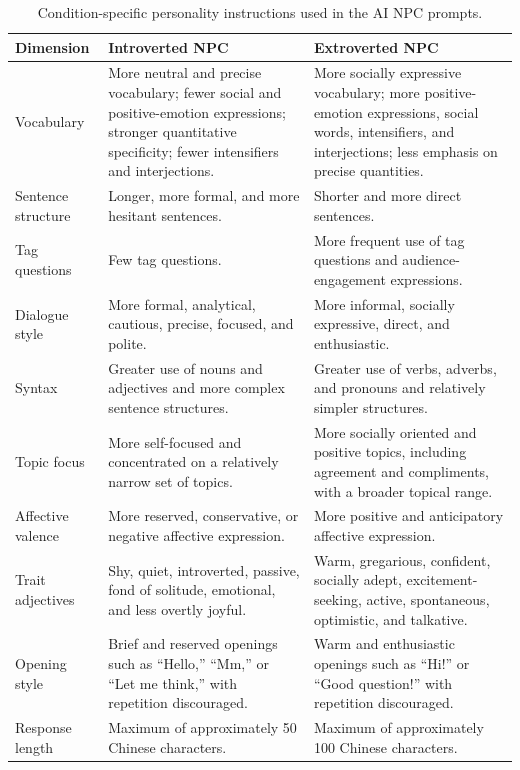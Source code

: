 \documentclass[a4paper,fleqn]{cas-sc}
\begin{document}
\begin{table}[t]
\centering
\footnotesize
\caption{Condition-specific personality instructions used in the AI NPC prompts.}
\label{tab:app-personality}
\begin{tabular}{p{}p{}p{}}
\toprule
\textbf{Dimension} &
\textbf{Introverted NPC} &
\textbf{Extroverted NPC} \\
\midrule

Vocabulary &
More neutral and precise vocabulary; fewer social and positive-emotion expressions; stronger quantitative specificity; fewer intensifiers and interjections. &
More socially expressive vocabulary; more positive-emotion expressions, social words, intensifiers, and interjections; less emphasis on precise quantities. \\

Sentence structure &
Longer, more formal, and more hesitant sentences. &
Shorter and more direct sentences. \\

Tag questions &
Few tag questions. &
More frequent use of tag questions and audience-engagement expressions. \\

Dialogue style &
More formal, analytical, cautious, precise, focused, and polite. &
More informal, socially expressive, direct, and enthusiastic. \\

Syntax &
Greater use of nouns and adjectives and more complex sentence structures. &
Greater use of verbs, adverbs, and pronouns and relatively simpler structures. \\

Topic focus &
More self-focused and concentrated on a relatively narrow set of topics. &
More socially oriented and positive topics, including agreement and compliments, with a broader topical range. \\

Affective valence &
More reserved, conservative, or negative affective expression. &
More positive and anticipatory affective expression. \\

Trait adjectives &
Shy, quiet, introverted, passive, fond of solitude, emotional, and less overtly joyful. &
Warm, gregarious, confident, socially adept, excitement-seeking, active, spontaneous, optimistic, and talkative. \\

Opening style &
Brief and reserved openings such as ``Hello,'' ``Mm,'' or ``Let me think,'' with repetition discouraged. &
Warm and enthusiastic openings such as ``Hi!'' or ``Good question!'' with repetition discouraged. \\

Response length &
Maximum of approximately 50 Chinese characters. &
Maximum of approximately 100 Chinese characters. \\

\bottomrule
\end{tabular}
\end{table}
\end{document}
